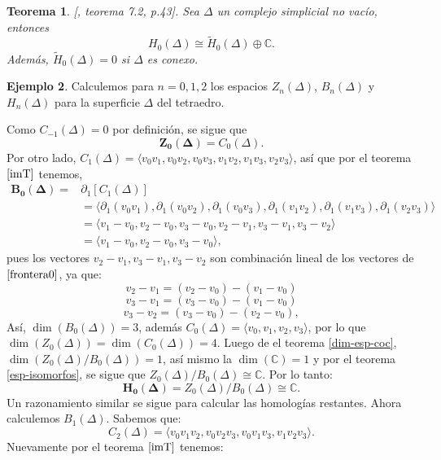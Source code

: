 \documentclass[12pt]{book}
\newtheorem{theorem}{Teorema}[section]
\theoremstyle{definition}
\newtheorem{example}[theorem]{Ejemplo}
\newcounter{in}
\newcounter{ini}
\begin{document}
\begin{theorem}{[\cite{munkres1984elements}, teorema 7.2, p.43]}.
  Sea $\Delta$ un complejo simplicial no vacío, entonces
  $$H_{0}(\Delta)\cong \widetilde H_{0}(\Delta)\oplus
  \mathbb{C}.$$
  Además, $\widetilde H_{0}(\Delta)=0$ si $\Delta$ es conexo.
\end{theorem}

\begin{example}
  Calculemos para $n=0, 1, 2$ los espacios $Z_{n}(\Delta)$,
  $B_{n}(\Delta)$ y~$H_{n}(\Delta)$ para la superficie $\Delta$ del tetraedro.

  Como $C_{-1}(\Delta)=0$ por definición, se sigue que
  $$\boldsymbol{Z_{0}(\Delta)}=C_{0}(\Delta).$$
  Por otro lado, $C_{1}(\Delta)=\langle v_{0}v_{1},v_{0}v_{2},v_{0}v_{3},v_{1}v_{2},v_{1}v_{3},v_{2}v_{3}\rangle$,
  así que por el teorema $\ref{imT}$ tenemos, 
  \begin{align}
    \label{frontera0}
    \boldsymbol{B_{0}(\Delta)}=&\partial_{1}[C_{1}(\Delta)]\nonumber\\
    &=\langle \partial_{1}(v_{0}v_{1}),\partial_{1}(v_{0}v_{2}),\partial_{1}(v_{0}v_{3}),\partial_{1}(v_{1}v_{2}),\partial_{1}(v_{1}v_{3}),\partial_{1}(v_{2}v_{3})\rangle\nonumber\\
    &=\langle v_{1}-v_{0},v_{2}-v_{0},v_{3}-v_{0},v_{2}-v_{1},v_{3}-v_{1},v_{3}-v_{2}\rangle\nonumber\\
    &=\langle v_{1}-v_{0},v_{2}-v_{0},v_{3}-v_{0}\rangle,
  \end{align} 
  pues los vectores $v_{2}-v_{1}, v_{3}-v_{1}, v_{3}-v_{2}$ son
  combinación lineal de los vectores de $\ref{frontera0}$, ya que:
  $$v_{2}-v_{1}=(v_{2}-v_{0})-(v_{1}-v_{0})$$
  $$v_{3}-v_{1}=(v_{3}-v_{0})-(v_{1}-v_{0})$$
  $$v_{3}-v_{2}=(v_{3}-v_{0})-(v_{2}-v_{0}),$$
  Así, $\dim(B_{0}(\Delta))=3$, además $C_{0}(\Delta)=\langle
  v_{0},v_{1},v_{2},v_{3}\rangle$, por lo que
 $\dim(Z_{0}(\Delta))=\dim(C_{0}(\Delta))=4$. Luego de el teorema
 \ref{dim-esp-coc}, $\dim(Z_{0}(\Delta)/B_{0}(\Delta))=1$, así mismo
 la $\dim(\mathbb{C})=1$ y por el teorema \ref{esp-isomorfos}, se
 sigue que $Z_{0}(\Delta)/B_{0}(\Delta)\cong \mathbb{C}$.
 Por lo tanto:
 $$\boldsymbol{H_{0}(\Delta)}=Z_{0}(\Delta)/B_{0}(\Delta)\cong \mathbb{C}.$$
 Un razonamiento similar se sigue para calcular las homologías restantes.
 Ahora calculemos $B_{1}(\Delta)$. Sabemos que:
 $$C_{2}(\Delta)=\langle
 v_{0}v_{1}v_{2},v_{0}v_{2}v_{3},v_{0}v_{1}v_{3},v_{1}v_{2}v_{3}\rangle.$$
 Nuevamente por el teorema $\ref{imT}$ tenemos:
 \begin{align}  

\end{align}
\end{example}
\end{document}
